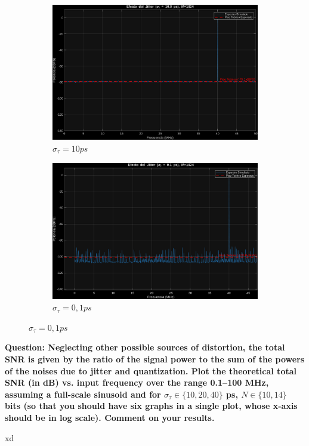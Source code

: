 \begin{figure}[H]
    \begin{subfigure}[t]{.5\textwidth}
        \centering
        \includegraphics[width=\linewidth]{img/task6_3_10ps.png}
        \caption{$\sigma_\tau = 10ps$}
    \end{subfigure}
    \begin{subfigure}[t]{.5\textwidth}
        \centering
        \includegraphics[width=\linewidth]{img/task6_3_01ps.png}
        \caption{$\sigma_\tau = 0,1ps$}
    \end{subfigure}

\end{figure}

\vspace{1cm}
\textbf{Question: Neglecting other possible sources of distortion, the total SNR is given by the ratio of the signal
    power to the sum of the powers of the noises due to jitter and quantization. Plot the theoretical total SNR (in dB) vs.
    input frequency over the range 0.1--100 MHz, assuming a full-scale sinusoid and for $\sigma_\tau \in \{10,20,40\}$ ps,
    $N\in \{10, 14\}$ bits (so that you should have six graphs in a single plot, whose x-axis should be in log scale).
    Comment on your results.
}
\vspace{0.5cm}

xd
